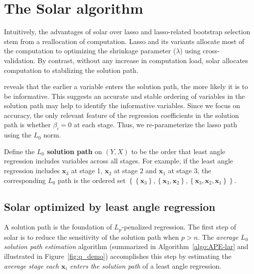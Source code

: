 \documentclass[11pt,review,authoryear]{elsarticle}
\begin{document}
\section{The Solar algorithm \label{section:algo}}

Intuitively, the advantages of solar over lasso and lasso-related bootstrap selection stem from a reallocation of computation. Lasso and its variants allocate most of the computation to optimizing the shrinkage parameter ($\lambda$) using cross-validation. By contrast, without any increase in computation load, solar allocates computation to stabilizing the solution path.

\citet[Theorem~2]{zhang09} reveals that the earlier a variable enters the solution path, the more likely it is to be informative. This suggests an accurate and stable ordering of variables in the solution path may help to identify the informative variables. Since we focus on accuracy, the only relevant feature of the regression coefficients in the solution path is whether $\beta_i = 0$ at each stage. Thus, we re-parameterize the lasso path using the $L_0$ norm.
%
\begin{definition}
  Define the \textbf{$L_0$ solution path} on $\left( Y, X \right)$ to be the order that least angle regression includes variables across all stages. For example, if the least angle regression includes $\mathbf{x}_3$ at stage 1, $\mathbf{x}_2$ at stage 2 and $\mathbf{x}_1$ at stage 3, the corresponding $L_0$ path is the ordered set $\left\{ \left\{\mathbf{x}_3 \right\}, \left\{ \mathbf{x}_3, \mathbf{x}_2 \right\}, \left\{ \mathbf{x}_3, \mathbf{x}_2, \mathbf{x}_1 \right\} \right\}$.
  \label{def:solution_path}
\end{definition}

\subsection{Solar optimized by least angle regression}

A solution path is the foundation of $L_p$-penalized regression. The first step of solar is to reduce the sensitivity of the solution path when $p > n$. The \emph{average $L_0$ solution path estimation} algorithm (summarized in Algorithm~\ref{algo:APE-lar} and illustrated in Figure~\ref{fig:q_demo}) accomplishes this step by estimating the \emph{average stage each $\mathbf{x}_i$ enters the solution path} of a least angle regression.
\end{document}
